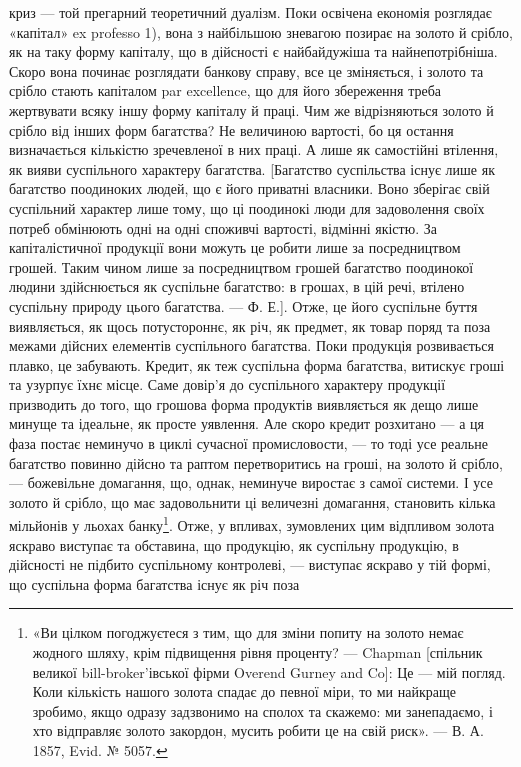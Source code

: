 криз — той прегарний теоретичний дуалізм. Поки освічена економія розглядає
«капітал» ex professo 1), вона з найбільшою зневагою позирає на золото й срібло,
як на таку форму капіталу, що в дійсності є найбайдужіша та найнепотрібніша.
Скоро вона починає розглядати банкову справу, все це зміняється, і золото та
срібло стають капіталом par excellence, що для його збереження треба жертвувати
всяку іншу форму капіталу й праці. Чим же відрізняються золото й
срібло від інших форм багатства? Не величиною вартості, бо ця остання визначається
кількістю зречевленої в них праці. А лише як самостійні втілення, як вияви
суспільного характеру багатства. [Багатство суспільства існує лише як багатство
поодиноких людей, що є його приватні власники. Воно зберігає свій суспільний
характер лише тому, що ці поодинокі люди для задоволення своїх потреб
обмінюють одні на одні споживчі вартості, відмінні якістю. За капіталістичної
продукції вони можуть це робити лише за посредництвом грошей. Таким
чином лише за посредництвом грошей багатство поодинокої людини здійснюється як
суспільне багатство: в грошах, в цій речі, втілено суспільну природу цього багатства.
— Ф. Е.]. Отже, це його суспільне буття виявляється, як щось потустороннє,
як річ, як предмет, як товар поряд та поза межами дійсних елементів суспільного
багатства. Поки продукція розвивається плавко, це забувають. Кредит, як теж
суспільна форма багатства, витискує гроші та узурпує їхнє місце. Саме довір’я
до суспільного характеру продукції призводить до того, що грошова форма продуктів
виявляється як дещо лише минуще та ідеальне, як просте уявлення. Але
скоро кредит розхитано — а ця фаза постає неминучо в циклі сучасної промисловости,
— то тоді усе реальне багатство повинно дійсно та раптом перетворитись
на гроші, на золото й срібло, — божевільне домагання, що, однак, неминуче виростає
з самої системи. І усе золото й срібло, що має задовольнити ці величезні
домагання, становить кілька мільйонів у льохах банку\footnote{
«Ви цілком погоджуєтеся з тим, що для зміни попиту на золото немає жодного шляху, крім
підвищення
рівня проценту? — Chapman [спільник великої bill-broker’івської фірми Overend Gurney and Co]:
Це — мій погляд. Коли кількість нашого золота спадає до певної міри, то ми найкраще зробимо, якщо
одразу задзвонимо на сполох та скажемо: ми занепадаємо, і хто відправляє золото закордон, мусить
робити це на свій риск». — В. А. 1857, Evid. № 5057.
}. Отже, у впливах,
зумовлених цим відпливом золота яскраво виступає та обставина, що продукцію,
як суспільну продукцію, в дійсності не підбито суспільному контролеві, —
виступає яскраво у тій формі, що суспільна форма багатства існує як річ поза
